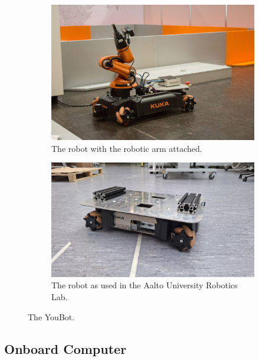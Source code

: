 \documentclass[a4paper, 12pt]{article}
\newif\ifshownotes
\newcommand{\notes}[1]{\ifshownotes\textcolor{blue}{#1}\fi}
\begin{document}
    \begin{figure}[H]
        \centering
        \begin{subfigure}[t]{0.49\linewidth}
            \centering
            \includegraphics[width=\linewidth]{images/sec2/youbot_with_arm.png}
            \caption{The robot with the robotic arm attached. \notes{[cite]}}
        \end{subfigure}
        \hfill
        \begin{subfigure}[t]{0.49\linewidth}
            \centering
            \includegraphics[width=\linewidth]{images/sec2/youbot_irl.jpg}
            \caption{The robot as used in the Aalto University Robotics Lab.}
            \label{fig:youbot-aalto}
        \end{subfigure}
        \caption{The YouBot.}
    \end{figure}

    \subsection{Onboard Computer}
\end{document}
